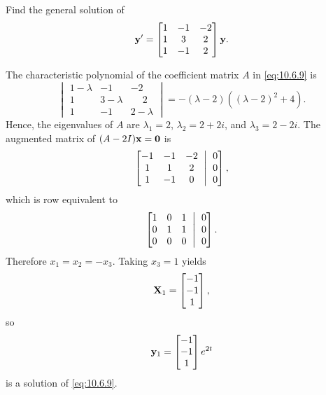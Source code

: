 \begin{example}\label{example:10.6.4}
 Find the general solution of
\begin{equation} \label{eq:10.6.9}
\mathbf{y}'=\begin{bmatrix}1&-1&-2\\1&3&2\\1&-1&2\end{bmatrix}\mathbf{y}.
\end{equation}
\end{example}

\begin{solution}
The characteristic
polynomial of the  coefficient matrix $A$ in  \eqref{eq:10.6.9} is
\[
\begin{vmatrix}
1-\lambda&-1&-2\\ 1&3-\lambda&\phantom{-}2\\ 1&-1&2-\lambda
\end{vmatrix}=
-(\lambda-2)\left((\lambda-2)^2+4\right).
 \]
Hence, the eigenvalues of $A$ are $\lambda_1=2$, $\lambda_2=2+2i$,
and $\lambda_3=2-2i$.
The augmented matrix of $(A-2I)\mathbf{x}=\mathbf{0}$ is
\[
\amatrix{-1&-1&-2\\1&1&2\\1&-1&0}{0\\0\\0},
\]
which is row equivalent to
\[
\amatrix{1&0&1\\0&1&1\\0&0&0}{0\\0\\0}.
\]
Therefore $x_1=x_2=-x_3$.  Taking $x_3=1$ yields
\[
\mathbf{X}_1=\begin{bmatrix}-1\\-1\\1\end{bmatrix},
\]
so
\[
\mathbf{y}_1=\begin{bmatrix}-1\\-1\\1\end{bmatrix}e^{2t}
\]
is a solution of  \eqref{eq:10.6.9}.


\end{solution}
